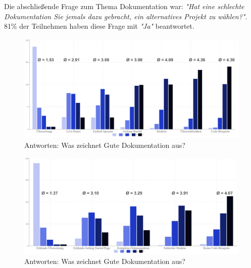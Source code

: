 \bigskip
\bigskip
\noindent
Die abschließende Frage zum Thema Dokumentation war: \textit{"Hat eine schlechte Dokumentation Sie jemals
    dazu gebracht, ein alternatives Projekt zu wählen?"}. 81\% der Teilnehmen haben diese Frage mit
\textit{"Ja"} beantwortet. 




\begin{figure}[h]
    \centering
    \includegraphics[scale=0.05]{figures/05/GuteDoku_BarChart.png}
    \caption{Antworten: Was zeichnet Gute Dokumentation aus?}
    \label{abb:GuteDoku_BarChart}
\end{figure}

\begin{figure}[h]
    \centering
    \includegraphics[scale=0.05]{figures/05/SchlechteDoku_BarChart.png}
    \caption{Antworten: Was zeichnet Gute Dokumentation aus?}
    \label{abb:SchlechteDoku_BarChart}
\end{figure}
